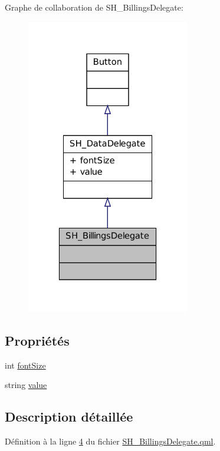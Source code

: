 Graphe de collaboration de S\-H\-\_\-\-Billings\-Delegate\-:
\nopagebreak
\begin{figure}[H]
\begin{center}
\leavevmode
\includegraphics[width=202pt]{classSH__BillingsDelegate__coll__graph}
\end{center}
\end{figure}
\subsection*{Propriétés}
\begin{DoxyCompactItemize}
\item 
int \hyperlink{classSH__DataDelegate_afbb41ad9b513c7f27e7b5ad90d82e95b}{font\-Size}
\item 
string \hyperlink{classSH__DataDelegate_acb9da3c73493c88865e08d9575f26482}{value}
\end{DoxyCompactItemize}


\subsection{Description détaillée}


Définition à la ligne \hyperlink{SH__BillingsDelegate_8qml_source_l00004}{4} du fichier \hyperlink{SH__BillingsDelegate_8qml_source}{S\-H\-\_\-\-Billings\-Delegate.\-qml}.



